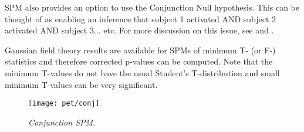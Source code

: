 SPM also provides an option to use the Conjunction Null
hypothesis. This can be thought of as enabling an inference that subject 1 activated AND subject 2 activated AND subject 3... etc. For more discussion on this issue, see
\cite{karl_conj_revisit} and \cite{tom_valid}.

Gaussian field theory results are available for SPMs of minimum T- (or F-) statistics and therefore corrected p-values can be computed.  Note that the minimum T-values do not have the usual Student's T-distribution and small minimum T-values can be very significant.
\begin{figure}
\begin{center}
\texttt{[image: pet/conj]}
\caption{\em Conjunction SPM. \label{conj}}
\end{center}
\end{figure}

